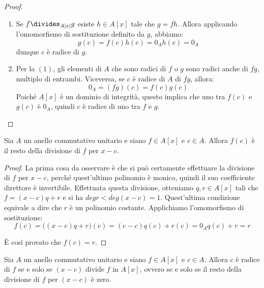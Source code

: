 \begin{proof}
	\begin{enumerate}
		\item Se $f \divides_{A[x]} g$ esiste $h \in A[x]$ tale che $g=fh$. Allora applicando l'omomorfismo di sostituzione definito da $g$, abbiamo:
		\begin{displaymath}
			g(c) = f(c)h(c) = 0_{A}h(c)=0_{A}
		\end{displaymath}
		dunque $c$ è radice di $g$.
		\item Per la $(1)$, gli elementi di $A$ che sono radici di $f$ o $g$ sono radici anche di $fg$, multiplo di entrambi. Viceversa, se $c$ è radice di $A$ di $fg$, allora:
		\begin{displaymath}
			0_{A} = (fg)(c)=f(c)g(c)
		\end{displaymath}
		Poiché $A[x]$ è un dominio di integrità, questo implica che uno tra $f(c)$ e $g(c)$ è $0_{A}$, quindi $c$ è radice di uno tra $f$ e $g$.
	\end{enumerate}
\end{proof}

\begin{teorbox}
	Sia $A$ un anello commutativo unitario e siano $f \in A[x]$ e $c \in A$. Allora $f(c)$ è il resto della divisione di $f$ per $x-c$.
\end{teorbox}

\begin{proof}
	La prima cosa da osservare è che si può certamente effettuare la divisione di $f$ per $x-c$, perché quest'ultimo polinomio è monico, quindi il suo coefficiente direttore è invertibile. Effettuata questa divisione, otteniamo $q,r \in A[x]$ tali che $f=(x-c)q+r$ e si ha $deg r < deg (x-c) =1$. Quest'ultima condizione equivale a dire che $r$ è un polinomio costante. Applichiamo l'omomorfismo di sostituzione:
	\begin{displaymath}
		f(c) = \bigl((x-c)q+r\bigr)(c)= (c-c)q(c)+r(c)=0_{A}q(c)+r=r
	\end{displaymath}
	
	È così provato che $f(c)=r$. 
\end{proof}

\begin{teorbox}[di Ruffini]\label{thm:ruffini}
	Sia $A$ un anello commutativo unitario e siano $f \in A[x]$ e $c \in A$. Allora $c$ è radice di $f$ se e solo se $(x-c)$ divide $f$ in $A[x]$, ovvero se e solo se il resto della divisione di $f$ per $(x-c)$ è zero.
\end{teorbox}

